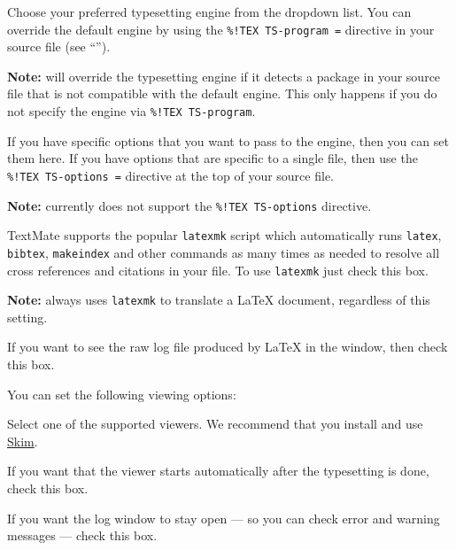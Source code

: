 \documentclass[11pt, x11names]{article}
\begin{document}
\begin{description}[style=multiline, leftmargin=4cm]

  \item[Default Engine] Choose your preferred typesetting engine from the dropdown list. You can override the default engine by using the \texttt{\%!TEX\ TS-program\ =} directive in your source file (see “”).

  \textbf{Note:}  will override the typesetting engine if it detects a package in your source file that is not compatible with the default engine. This only happens if you do not specify the engine via \texttt{\%!TEX\ TS-program}.

  \item[Options] If you have specific options that you want to pass to the engine, then you can set them here. If you have options that are specific to a single file, then use the \texttt{\%!TEX\ TS-options\ =} directive at the top of your source file.

  \textbf{Note:}  currently does not support the \texttt{\%!TEX\ TS-options} directive.

  \item[Use Latexmk] TextMate supports the popular \texttt{latexmk} script which automatically runs \texttt{latex}, \texttt{bibtex}, \texttt{makeindex} and other commands as many times as needed to resolve all cross references and citations in your file. To use \texttt{latexmk} just check this box.

  \textbf{Note:}  always uses \texttt{latexmk} to translate a LaTeX document, regardless of this setting.

  \item[Verbose TeX output] If you want to see the raw log file produced by LaTeX in the  window, then check this box.

\end{description}

You can set the following viewing options:

\begin{description}[style=multiline, leftmargin=5cm]

  \item[View in] Select one of the supported viewers. We recommend that you install and use \href{http://skim-app.sourceforge.net}{Skim}.

  \item[Show PDF automatically] If you want that the viewer starts automatically after the typesetting is done, check this box.

  \item[Keep log window open] If you want the log window to stay open — so you can check error and warning messages — check this box.

\end{description}
\end{document}
